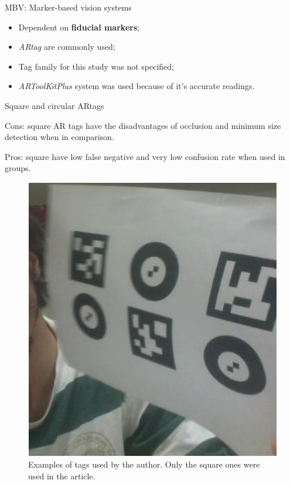 \documentclass[10pt]{beamer}
\begin{document}

\begin{frame}[fragile]{MBV: Marker-based vision systems}

  \begin{itemize}
    \item Dependent on \textbf{fiducial markers};
    \item \emph{ARtag} are commonly used;
    \item Tag family for this study was not specified;
    \item \emph{ARToolKitPlus} system was used because of it's accurate readings.
  \end{itemize}

\end{frame}


\begin{frame}[fragile]{Square and circular ARtags}

  Cons: square AR tags have the disadvantages of occlusion and minimum size detection when in comparison.

  Pros: square have low false negative and very low confusion rate when used in groups.

  \begin{figure}
    \centering
    \includegraphics[scale=0.1]{tags}
    \caption{Examples of tags used by the author. Only the square ones were used in the article.}
  \end{figure}

\end{frame}
\end{document}
